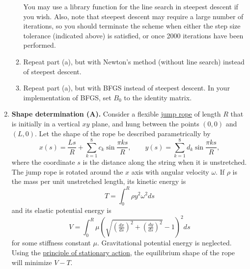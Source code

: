 \documentclass[11pt]{article}
\begin{document}
\begin{enumerate}
\begin{enumerate}
	You may use a library function for the line search in steepest descent
	if you wish. Also, note that steepest descent may require a large
	number of iterations, so you should terminate the scheme when either
	the step size tolerance (indicated above) is satisfied, or once
	2000 iterations have been performed.
      \item Repeat part (a), but with Newton's method (without line search)
	instead of steepest descent.
      \item Repeat part (a), but with BFGS instead of steepest descent. In your
	implementation of BFGS, set $B_0$ to the identity matrix.
    \end{enumerate}
  \item \textbf{Shape determination (A).} Consider a flexible
    \href{http://en.wikipedia.org/wiki/Skipping_rope}{jump rope} of length $R$
    that is initially in a vertical $xy$ plane, and hung between the points
    $(0,0)$ and $(L,0)$. Let the shape of the rope be described parametrically
    by
    \begin{equation}
      x(s) = \frac{Ls}{R} + \sum_{k=1}^8 c_k \sin \frac{\pi k s}{R}, \qquad y(s) = \sum_{k=1}^8 d_k \sin \frac{\pi k s}{R},
    \end{equation}
    where the coordinate $s$ is the distance along the string when it is
    unstretched. The jump rope is rotated around the $x$ axis with angular
    velocity $\omega$. If $\rho$ is the mass per unit unstretched length, its
    kinetic energy is
    \begin{equation}
      T= \int_0^R \rho y^2 \omega^2 ds
      \label{eq:kine}
    \end{equation}
    and its elastic potential energy is
    \begin{equation}
      V= \int_0^R \mu \left(\sqrt{\left(\tfrac{dx}{ds}\right)^2 + \left(\tfrac{dy}{ds}\right)^2}-1\right)^2 ds
      \label{eq:elae}
    \end{equation}
    for some stiffness constant $\mu$. Gravitational potential energy is
    neglected. Using the
    \href{http://en.wikipedia.org/wiki/Principle_of_least_action}{principle of
    stationary action}, the equilibrium shape of the rope will minimize $V-T$.


\end{enumerate}
\end{document}
